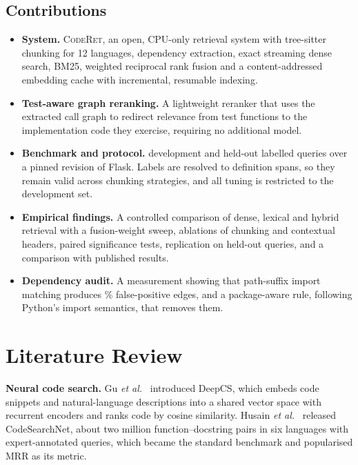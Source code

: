 \documentclass[conference]{IEEEtran}
\newcommand{\sys}{\textsc{CodeRet}}
\begin{document}
\subsection{Contributions}
\begin{itemize}
  \item \textbf{System.} \sys{}, an open, CPU-only retrieval system with
        tree-sitter chunking for 12 languages, dependency extraction, exact
        streaming dense search, BM25, weighted reciprocal rank fusion and a
        content-addressed embedding cache with incremental, resumable indexing.
  \item \textbf{Test-aware graph reranking.} A lightweight reranker that uses the
        extracted call graph to redirect relevance from test functions to the
        implementation code they exercise, requiring no additional model.
  \item \textbf{Benchmark and protocol.} \NQueries{} development and \HoQueries{}
        held-out labelled queries over a pinned revision of Flask. Labels are
        resolved to definition spans, so they remain valid across chunking
        strategies, and all tuning is restricted to the development set.
  \item \textbf{Empirical findings.} A controlled comparison of dense, lexical
        and hybrid retrieval with a fusion-weight sweep, ablations of chunking
        and contextual headers, paired significance tests, replication on held-out
        queries, and a comparison with published results.
  \item \textbf{Dependency audit.} A measurement showing that path-suffix import
        matching produces \FalseEdgePct{}\% false-positive edges, and a
        package-aware rule, following Python's import semantics, that removes them.
\end{itemize}

\section{Literature Review}

\textbf{Neural code search.} Gu \emph{et al.}~\cite{gu2018deep} introduced
DeepCS, which embeds code snippets and natural-language descriptions into a
shared vector space with recurrent encoders and ranks code by cosine
similarity. Husain \emph{et al.}~\cite{husain2019codesearchnet} released
CodeSearchNet, about two million function--docstring pairs in six languages
with expert-annotated queries, which became the standard benchmark and
popularised MRR as its metric.
\end{document}
